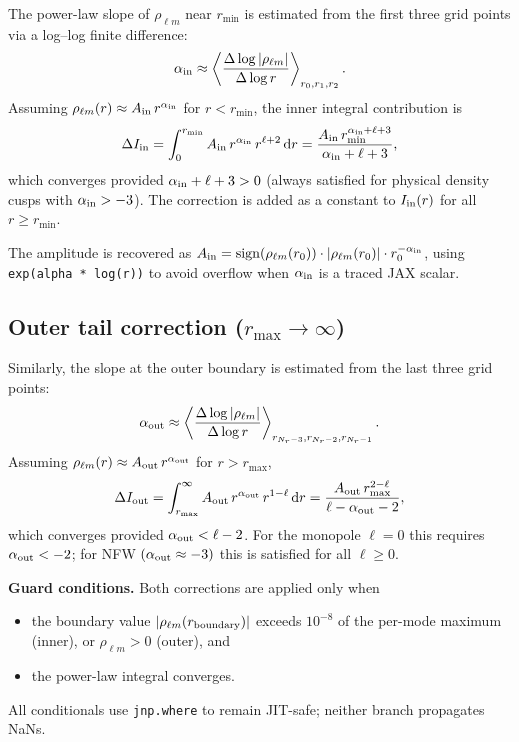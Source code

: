 \documentclass[11pt]{article}
\begin{document}
The power-law slope of $\rho_{\ell m}$ near $r_{\min}$ is estimated from the
first three grid points via a log--log finite difference:
\begin{equation}
  \alpha_{\rm in} \approx \left\langle
    \frac{\Delta\log|\rho_{\ell m}|}{\Delta\log r}
  \right\rangle_{r_0,r_1,r_2}.
\end{equation}
Assuming $\rho_{\ell m}(r) \approx A_{\rm in}\, r^{\alpha_{\rm in}}$ for
$r < r_{\min}$, the inner integral contribution is
\begin{equation}
  \Delta I_{\rm in}
  = \int_0^{r_{\min}} A_{\rm in}\, r^{\alpha_{\rm in}}\, r^{\ell+2}\,\mathrm{d}r
  = \frac{A_{\rm in}\, r_{\min}^{\alpha_{\rm in}+\ell+3}}
         {\alpha_{\rm in} + \ell + 3},
\end{equation}
which converges provided $\alpha_{\rm in} + \ell + 3 > 0$ (always satisfied
for physical density cusps with $\alpha_{\rm in} > -3$).  The correction is
added as a constant to $I_{\rm in}(r)$ for all $r \geq r_{\min}$.

The amplitude is recovered as
$A_{\rm in} = \mathrm{sign}(\rho_{\ell m}(r_0)) \cdot
|\rho_{\ell m}(r_0)| \cdot r_0^{-\alpha_{\rm in}}$,
using \texttt{exp(alpha * log(r))} to avoid overflow when $\alpha_{\rm in}$
is a traced JAX scalar.

\subsection{Outer tail correction ($r_{\max} \to \infty$)}
\label{sec:outer}

Similarly, the slope at the outer boundary is estimated from the last three
grid points:
\begin{equation}
  \alpha_{\rm out} \approx \left\langle
    \frac{\Delta\log|\rho_{\ell m}|}{\Delta\log r}
  \right\rangle_{r_{N_r-3},r_{N_r-2},r_{N_r-1}}.
\end{equation}
Assuming $\rho_{\ell m}(r) \approx A_{\rm out}\, r^{\alpha_{\rm out}}$ for
$r > r_{\max}$,
\begin{equation}
  \Delta I_{\rm out}
  = \int_{r_{\max}}^\infty A_{\rm out}\, r^{\alpha_{\rm out}}\, r^{1-\ell}\,\mathrm{d}r
  = \frac{A_{\rm out}\, r_{\max}^{2-\ell}}
         {\ell - \alpha_{\rm out} - 2},
\end{equation}
which converges provided $\alpha_{\rm out} < \ell - 2$.  For the monopole
$\ell=0$ this requires $\alpha_{\rm out} < -2$; for NFW $(\alpha_{\rm
out}\approx -3)$ this is satisfied for all $\ell \geq 0$.

\textbf{Guard conditions.}  Both corrections are applied only when
\begin{itemize}
  \item the boundary value $|\rho_{\ell m}(r_{\rm boundary})|$ exceeds
        $10^{-8}$ of the per-mode maximum (inner), or $\rho_{\ell m} > 0$
        (outer), and
  \item the power-law integral converges.
\end{itemize}
All conditionals use \texttt{jnp.where} to remain JIT-safe; neither branch
propagates NaNs.
\end{document}
